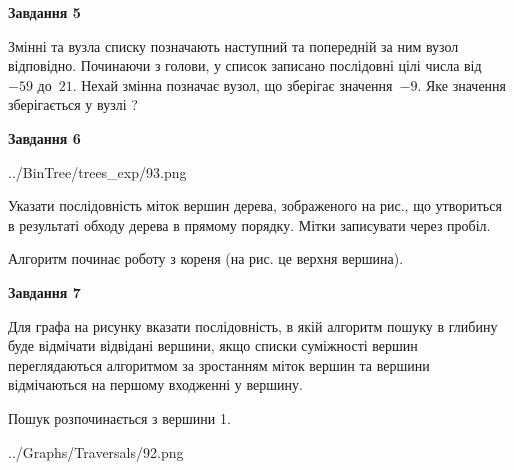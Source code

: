 \documentclass[12pt, ukrainian]{article}
\begin{document}
{\begin {large}
{\begin {center}\textbf{Завдання 5}\end {center}}\par
Змінні  та  вузла списку позначають наступний та попередній за ним вузол відповідно. Починаючи з голови, у список записано послідовні цілі числа від~$-59$ до~$21$. Нехай змінна  позначає вузол, що зберігає значення~$-9$.
Яке значення зберігається у вузлі  ?\par
\newpage

{\begin {center}\textbf{Завдання 6}\end {center}}\par

\begin{center}
	{../BinTree/trees_exp/93.png}
\end{center}
Указати послідовність міток вершин дерева, зображеного на рис., що утвориться в результаті обходу дерева в прямому порядку. Мітки записувати через пробіл.\par Алгоритм починає роботу з кореня (на рис. це верхня вершина).\par
\newpage

{\begin {center}\textbf{Завдання 7}\end {center}}\par
Для графа на рисунку вказати послідовність, в якій алгоритм пошуку в глибину буде відмічати відвідані вершини, якщо списки суміжності вершин переглядаються алгоритмом за зростанням міток вершин та вершини відмічаються на першому вход\-женні у вершину.\par
Пошук розпочинається з вершини 1.\par

\begin{center}
	{../Graphs/Traversals/92.png}
\end{center}\par
\newpage


\end{large}}
\end{document}
